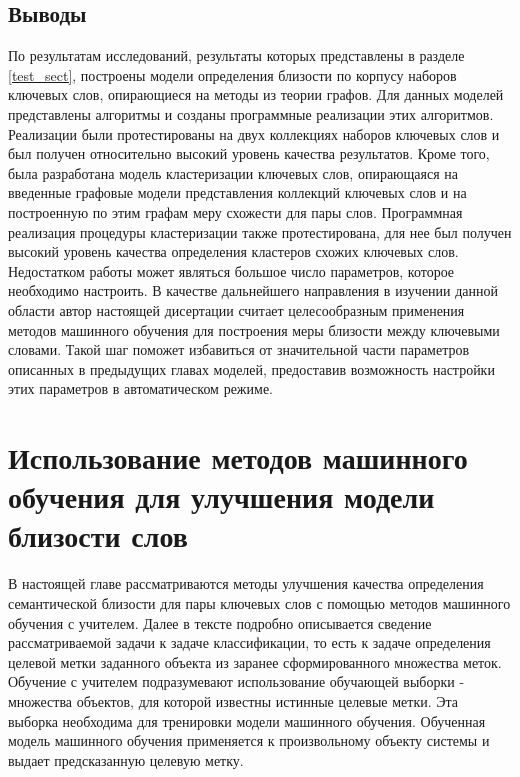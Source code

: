 \subsection{Выводы}
По результатам исследований, результаты которых представлены в разделе \ref{test_sect}, построены модели определения близости по корпусу наборов ключевых слов, опирающиеся на методы из теории графов. Для данных моделей представлены алгоритмы и созданы программные реализации этих алгоритмов. Реализации были протестированы на двух коллекциях наборов ключевых слов и был получен относительно высокий уровень качества результатов. Кроме того, была разработана модель кластеризации ключевых слов, опирающаяся на введенные графовые модели представления коллекций ключевых слов и на построенную по этим графам меру схожести для пары слов. Программная реализация процедуры кластеризации также протестирована, для нее был получен высокий уровень качества определения кластеров схожих ключевых слов.
Недостатком работы может являться большое число параметров, которое необходимо настроить. В качестве дальнейшего направления в изучении данной области автор настоящей дисертации считает целесообразным применения методов машинного обучения для построения меры близости между ключевыми словами. Такой шаг поможет избавиться от значительной части параметров описанных в предыдущих главах моделей, предоставив возможность настройки этих параметров в автоматическом режиме.

\section{Использование методов машинного обучения для улучшения модели близости слов} \label{ml_sim}
В настоящей главе рассматриваются методы улучшения качества определения семантической близости для пары ключевых слов с помощью методов машинного обучения с учителем. Далее в тексте подробно описывается сведение рассматриваемой задачи к задаче классификации, то есть к задаче определения целевой метки заданного объекта из заранее сформированного множества меток. Обучение с учителем подразумевают использование обучающей выборки - множества объектов, для которой известны истинные целевые метки. Эта выборка необходима для тренировки модели машинного обучения. Обученная модель машинного обучения применяется к произвольному объекту системы и выдает предсказанную целевую метку.

